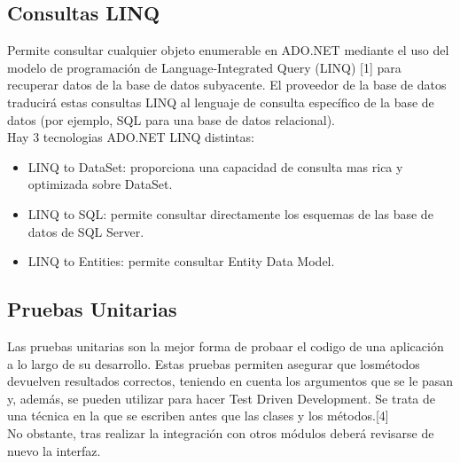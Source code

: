 \subsection{ Consultas LINQ}
	\par Permite consultar cualquier objeto  enumerable en ADO.NET mediante el uso del modelo de programación de Language-Integrated Query (LINQ) [1] para recuperar datos de la base de datos subyacente. El proveedor de la base de datos traducirá estas consultas LINQ al lenguaje de consulta específico de la base de datos (por ejemplo, SQL para una base de datos relacional).\\
Hay 3 tecnologias ADO.NET LINQ distintas:
\begin{itemize}
	\item LINQ to DataSet: proporciona una capacidad de consulta mas rica y optimizada sobre DataSet.
	\item LINQ to SQL: permite consultar directamente los esquemas de las base de datos de SQL Server.
	\item LINQ to Entities: permite consultar Entity Data Model.
\end{itemize}

\subsection{Pruebas Unitarias}
	\par Las pruebas unitarias son la mejor forma de probaar el codigo de una aplicación a lo largo de su desarrollo. Estas pruebas permiten asegurar que losmétodos devuelven resultados correctos, teniendo en cuenta los argumentos que se le pasan y, además, se pueden utilizar para hacer Test Driven Development. Se trata de una técnica en la que se escriben antes que las clases y los métodos.[4]\\
 No obstante, tras realizar la integración con otros módulos deberá revisarse de nuevo la interfaz.